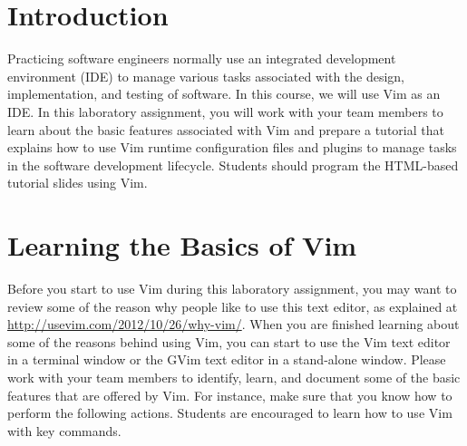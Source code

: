 

\usepackage[compact]{titlesec}



\section*{Introduction}

Practicing software engineers normally use an integrated development environment (IDE) to manage various tasks
associated with the design, implementation, and testing of software. In this course, we will use Vim as an IDE.  In this
laboratory assignment, you will work with your team members to learn about the basic features associated with Vim and
prepare a tutorial that explains how to use Vim runtime configuration files and plugins to manage tasks in the software
development lifecycle.  Students should program the HTML-based tutorial slides using Vim.

\section*{Learning the Basics of Vim}

Before you start to use Vim during this laboratory assignment, you may want to review some of the reason why people like
to use this text editor, as explained at \url{http://usevim.com/2012/10/26/why-vim/}.  When you are finished learning
about some of the reasons behind using Vim, you can start to use the Vim text editor in a terminal window or the GVim
text editor in a stand-alone window.  Please work with your team members to identify, learn, and document some of the
basic features that are offered by Vim.  For instance, make sure that you know how to perform the following actions.
Students are encouraged to learn how to use Vim with key commands.

